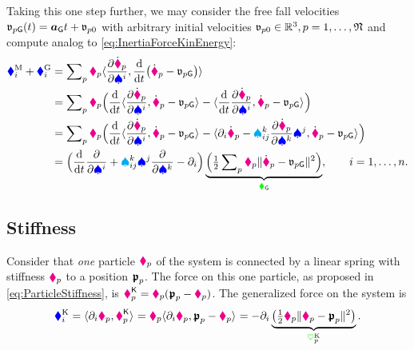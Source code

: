 \newcommand{\particleVelGravity}[1]{\particleStyle{v}_{#1\idxText{G}}}
Taking this one step further, we may consider the free fall velocities $\particleVelGravity{\PidxI}(t) = \gravityAcc t + \particleStyle{v}_{\PidxI 0}$ with arbitrary initial velocities $\mathfrak{v}_{p 0} \in \mathbb{R}^3, p=1,\ldots,\mathfrak{N}$ and compute analog to \eqref{eq:InertiaForceKinEnergy}:
\begin{align}
  \genForceInertiaCoeff{\LidxI} + \genForceGravityCoeff{\LidxI}
  &= \sumParticles \particleMass{\PidxI} \sProd{\pdiff[\particlePosd{\PidxI}]{\sysVelCoeff{\LidxI}}}{\diff{t}\big(\particlePosd{\PidxI} - \particleVelGravity{\PidxI} \big)}
 \nonumber\\
  &= \sumParticles \particleMass{\PidxI}  \Big( \diff{t} \sProd{\pdiff[\particlePosd{\PidxI}]{\sysVelCoeff{\LidxI}}}{\particlePosd{\PidxI} - \particleVelGravity{\PidxI}} - \sProd{\diff{t} \pdiff[\particlePosd{\PidxI}]{\sysVelCoeff{\LidxI}}}{\particlePosd{\PidxI} - \particleVelGravity{\PidxI}}\Big)
 \nonumber\\
  &= \sumParticles \particleMass{\PidxI}  \Big( \diff{t} \sProd{\pdiff[\particlePosd{\PidxI}]{\sysVelCoeff{\LidxI}}}{\particlePosd{\PidxI} - \particleVelGravity{\PidxI}} - \sProd{\dirDiff{\LidxI} \particlePosd{\PidxI} - \BoltzSym{\LidxIII}{\LidxI}{\LidxII} \pdiff[\particlePosd{\PidxI}]{\sysVelCoeff{\LidxIII}} \sysVelCoeff{\LidxII}}{\particlePosd{\PidxI} - \particleVelGravity{\PidxI}}\Big)
 \nonumber\\
  &= \Big(\diff{t} \pdiff{\sysVelCoeff{\LidxI}} + \BoltzSym{\LidxIII}{\LidxI}{\LidxII} \sysVelCoeff{\LidxII} \pdiff{\sysVelCoeff{\LidxIII}} - \dirDiff{\LidxI} \Big)
  \underbrace{\Big( \tfrac{1}{2} \sumParticles \particleMass{\PidxI} \norm{\particlePosd{\PidxI} - \particleVelGravity{\PidxI}}^2 \Big)}_{\kineticEnergy_{\idxText{G}}},
  \qquad
  \LidxI = 1,\ldots,\dimConfigSpace.
\end{align}

\subsection{Stiffness}\label{sec:ParticleSysStiffness}
Consider that \textit{one} particle $\boldsymbol{\textcolor{magenta}{\blacklozenge}}_{p}$ of the system is connected by a linear spring with stiffness $\textcolor{magenta}{\blacklozenge}_{p}$ to a position $\boldsymbol{\mathfrak{p}}_{p}$.
The force on this one particle, as proposed in \eqref{eq:ParticleStiffness}, is $\boldsymbol{\textcolor{magenta}{\blacklozenge}}_{p}^{\mathsf{K}} = \textcolor{magenta}{\blacklozenge}_{p} (\boldsymbol{\mathfrak{p}}_{p} - \boldsymbol{\textcolor{magenta}{\blacklozenge}}_{p})$.
The generalized force on the system is
\begin{align}
 \textcolor{blue}{\blacklozenge}^{\mathrm{K}}_{i} 
 = \langle \partial_{i} \boldsymbol{\textcolor{magenta}{\blacklozenge}}_{p}, \boldsymbol{\textcolor{magenta}{\blacklozenge}}_{p}^{\mathsf{K}} \rangle_{} 
 = \textcolor{magenta}{\blacklozenge}_{p} \langle \partial_{i} \boldsymbol{\textcolor{magenta}{\blacklozenge}}_{p}, \boldsymbol{\mathfrak{p}}_{p} - \boldsymbol{\textcolor{magenta}{\blacklozenge}}_{p} \rangle_{}
 = -\partial_{i} \underbrace{\big( \tfrac{1}{2} \textcolor{magenta}{\blacklozenge}_{p} \| \boldsymbol{\textcolor{magenta}{\blacklozenge}}_{p} - \boldsymbol{\mathfrak{p}}_{p} \|_{}^2 \big)}_{\textcolor{green}{\heartsuit}^{\mathrm{K}}_{p}}.
\end{align}

